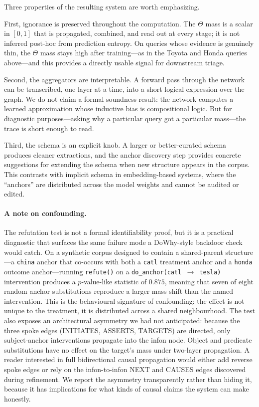 \documentclass[11pt,a4paper]{article}
\begin{document}
Three properties of the resulting system are worth emphasizing.

First, ignorance is preserved throughout the computation. The
$\Theta$ mass is a scalar in $[0, 1]$ that is propagated,
combined, and read out at every stage; it is not inferred
post-hoc from prediction entropy. On queries whose evidence is
genuinely thin, the $\Theta$ mass stays high after
training---as in the Toyota and Honda queries above---and this
provides a directly usable signal for downstream triage.

Second, the aggregators are interpretable. A forward pass
through the network can be transcribed, one layer at a time,
into a short logical expression over the graph. We do not
claim a formal soundness result: the network computes a
learned approximation whose inductive bias is compositional
logic. But for diagnostic purposes---asking why a particular
query got a particular mass---the trace is short enough to
read.

Third, the schema is an explicit knob. A larger or
better-curated schema produces cleaner extractions, and the
anchor discovery step provides concrete suggestions for
extending the schema when new structure appears in the corpus.
This contrasts with implicit schema in embedding-based
systems, where the ``anchors'' are distributed across the
model weights and cannot be audited or edited.

\paragraph{A note on confounding.} The refutation test is not a
formal identifiability proof, but it is a practical diagnostic
that surfaces the same failure mode a DoWhy-style backdoor check
would catch. On a synthetic corpus designed to contain a
shared-parent structure---a \texttt{china} anchor that co-occurs
with both a \texttt{catl} treatment anchor and a \texttt{honda}
outcome anchor---running \texttt{refute()} on a
\texttt{do\_anchor(catl $\to$ tesla)} intervention produces a
$p$-value-like statistic of $0.875$, meaning that seven of eight
random anchor substitutions reproduce a larger mass shift than
the named intervention. This is the behavioural signature of
confounding: the effect is not unique to the treatment, it is
distributed across a shared neighbourhood. The test also exposes
an architectural asymmetry we had not anticipated: because the
three spoke edges (INITIATES, ASSERTS, TARGETS) are directed,
only subject-anchor interventions propagate into the infon node.
Object and predicate substitutions have no effect on the target's
mass under two-layer propagation. A reader interested in full
bidirectional causal propagation would either add reverse spoke
edges or rely on the infon-to-infon NEXT and CAUSES edges
discovered during refinement. We report the asymmetry
transparently rather than hiding it, because it has implications
for what kinds of causal claims the system can make honestly.
\end{document}

